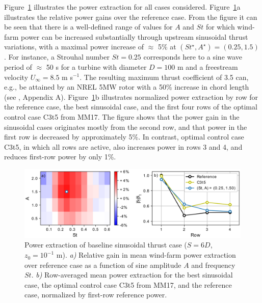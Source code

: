 \documentclass[wes, manuscript]{copernicus}
\begin{document}
Figure~\ref{fig:sinus_baseline} illustrates the power extraction for all cases considered. Figure~\ref{fig:sinus_baseline}a illustrates the relative power gains over the reference case. From the figure it can be seen that there is a well-defined range of values for $A$ and $St$ for which wind-farm power can be increased substantially through upstream sinusoidal thrust variations, with a maximal power increase of $\approx$ 5\% at $(St^\star, A^\star) = (0.25, 1.5)$. For instance, a Strouhal number $St = 0.25$ corresponds here to a sine wave period of $\approx$ 50 s for a turbine with diameter $D = 100$ m and a freestream velocity $U_\infty = 8.5$ m s$^{-1}$. The resulting maximum thrust coefficient of 3.5 can, e.g., be attained by an NREL 5MW rotor with a 50\% increase in chord length (see \citealp{goit2015optimal}, Appendix A). Figure~\ref{fig:sinus_baseline}b illustrates normalized power extraction by row for the reference case, the best sinusoidal case, and the first four rows of the optimal control case C3t5 from MM17. The figure shows that the power gain in the sinusoidal cases originates mostly from the second row, and that power in the first row is decreased by approximately 5\%. In contrast, optimal control case C3t5, in which all rows are active, also increases power in rows 3 and 4, and reduces first-row power by only 1\%. 
\begin{figure}
	\centering
	\includegraphics[width=\textwidth]{gains_turbulent_6D_6D_6D_wide_inphase2.eps}
	\caption{Power extraction of baseline sinusoidal thrust case ($S = 6D$, $z_0 = 10^{-1}$ m). \emph{a) } Relative gain in mean wind-farm power extraction over reference case as a function of sine amplitude $A$ and frequency $St$. \emph{b) } Row-averaged mean power extraction for the best sinusoidal case, the optimal control case C3t5 from MM17, and the reference case, normalized by first-row reference power.\label{fig:sinus_baseline} }
\end{figure}
\end{document}
